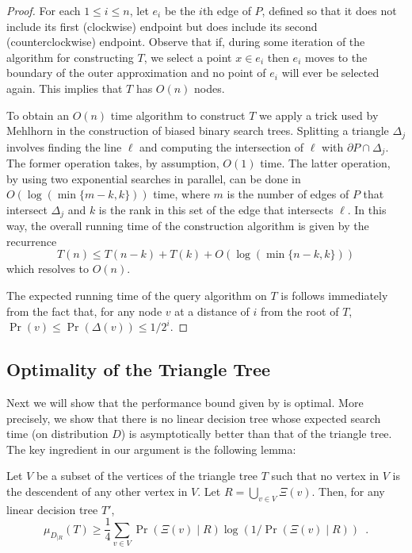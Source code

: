 \documentclass[charterfonts,lotsofwhite]{patmorin}
\newcommand{\boundary}{\partial}
\begin{document}
\begin{proof}
For each $1\le i\le n$, let $e_i$ be the $i$th edge of $P$, defined so
that it does not include its first (clockwise) endpoint but does
include its second (counterclockwise) endpoint.  Observe that if,
during some iteration of the algorithm for constructing $T$, we select
a point $x\in e_i$ then $e_i$ moves to the boundary of the outer
approximation and no point of $e_i$ will ever be selected again.  This
implies that $T$ has $O(n)$ nodes.

To obtain an $O(n)$ time algorithm to construct $T$ we apply a trick
used by Mehlhorn \cite{m75} in the construction of biased binary
search trees.  Splitting a triangle $\Delta_j$ involves finding the
line $\ell$ and computing the intersection of $\ell$ with
$\boundary P\cap \Delta_j$.  The former operation takes, by
assumption, $O(1)$ time.  The latter operation, by using two
exponential searches in parallel, can be done in $O(\log
(\min\{m-k,k\}))$ time, where $m$ is the number of edges of $P$ that
intersect $\Delta_j$ and $k$ is the rank in this set of the edge that
intersects $\ell$.  In this way, the overall running time of the
construction algorithm is given by the recurrence
\[
    T(n) \le T(n-k) + T(k) + O(\log(\min\{n-k,k\}))
\]
which resolves to $O(n)$.

The expected running time of the query algorithm on $T$ is follows
immediately from the fact that, for any node $v$ at a distance of $i$
from the root of $T$, $\Pr(v) \le \Pr(\Delta(v)) \le 1/2^i$.
\end{proof}


\subsection{Optimality of the Triangle Tree}

Next we will show that the performance bound given by
 is optimal.  More precisely, we show that there
is no linear decision tree whose expected search time (on distribution
$D$) is asymptotically better than that of the triangle tree.  The key
ingredient in our argument is the following lemma:

\begin{lem}
Let $V$ be a subset of the vertices of the triangle tree $T$ such that
no vertex in $V$ is the descendent of any other vertex in $V$.  
Let $R=\bigcup_{v\in V} \Xi(v)$. Then, for any linear decision
tree $T'$,
\[
    \mu_{D_{|R}}(T) 
	\ge \frac{1}{4}\sum_{v\in V}\Pr(\Xi(v)\mid
R)\log(1/\Pr(\Xi(v)\mid R)) \enspace .
\]
\end{lem}
\end{document}
